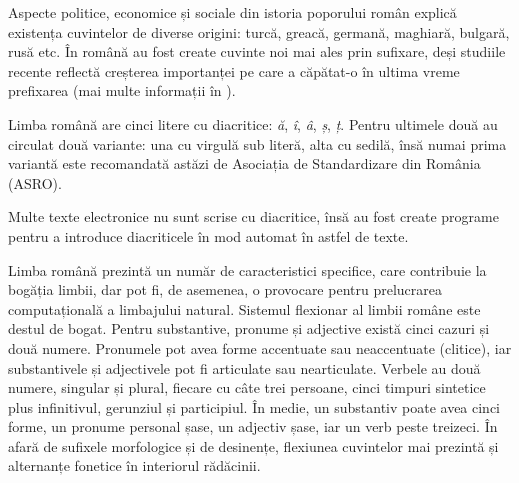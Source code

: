 \begin{multicols}{2}
Aspecte politice, economice și sociale din istoria poporului român explică existența cuvintelor de diverse origini: turcă, greacă, germană, maghiară, bulgară, rusă etc. În română au fost create cuvinte noi mai ales prin sufixare, deși studiile recente reflectă creșterea importanței pe care a căpătat-o în ultima vreme prefixarea (mai multe informații în \cite{brancus}).


Limba română are cinci litere cu diacritice: \textit{ă}, \textit{î}, \textit{â}, \textit{ș}, \textit{ț}. Pentru ultimele două au circulat două variante: una cu virgulă sub literă, alta cu sedilă, însă numai prima variantă este recomandată astăzi de Asociația de Standardizare din România (ASRO). 

Multe texte electronice nu sunt scrise cu diacritice, însă au fost create programe pentru a introduce diacriticele în mod automat în astfel de texte.


Limba română prezintă un număr de caracteristici specifice, care contribuie la bogăția limbii, dar pot fi, de asemenea, o provocare pentru prelucrarea computațională a limbajului natural. Sistemul flexionar al limbii române este destul de bogat. Pentru substantive, pronume și adjective există cinci cazuri și două numere. Pronumele pot avea forme accentuate sau neaccentuate (clitice), iar substantivele și adjectivele pot fi articulate sau nearticulate. Verbele au două numere, singular și plural, fiecare cu câte trei persoane, cinci timpuri sintetice plus infinitivul, gerunziul și participiul. În medie, un substantiv poate avea cinci forme, un pronume personal șase, un adjectiv șase, iar un verb peste treizeci. În afară de sufixele morfologice și de desinențe, flexiunea cuvintelor mai prezintă și alternanțe fonetice în interiorul rădăcinii.



\end{multicols}

